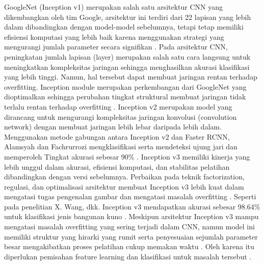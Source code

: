     GoogleNet (Inception v1) merupakan salah satu arsitektur CNN yang dikembangkan oleh tim Google, arsitektur ini terdiri dari 22 lapisan yang lebih dalam dibandingkan dengan model-model sebelumnya, tetapi tetap memiliki efisiensi komputasi yang lebih baik karena menggunakan strategi yang mengurangi jumlah parameter secara signifikan \autocite{Zhong2015}. Pada arsitektur CNN, peningkatan jumlah lapisan (layer) merupakan salah satu cara langsung untuk meningkatkan kompleksitas jaringan sehingga menghasilkan akurasi klasifikasi yang lebih tinggi. Namun, hal tersebut dapat membuat jaringan rentan terhadap overfitting. Inception module merupakan perkembangan dari GoogleNet yang dioptimalkan sehingga perubahan tingkat struktural membuat jaringan tidak terlalu rentan terhadap overfitting \autocite{Ahmed2020}. Inception v2 merupakan model yang dirancang untuk mengurangi kompleksitas jaringan konvolusi (convolution network) dengan membuat jaringan lebih lebar daripada lebih dalam. Menggunakan metode gabungan antara Inception v2 dan Faster RCNN, Alamsyah dan Fachrurrozi mengklasifikasi serta mendeteksi ujung jari dan memperoleh Tingkat akurasi sebesar 90\% \autocite{Alamsyah2019}. Inception v3 memiliki kinerja yang lebih unggul dalam akurasi, efisiensi komputasi, dan stabilitas pelatihan dibandingkan dengan versi sebelumnya. Perbaikan pada teknik factorization, regulasi, dan optimalisasi arsitektur membuat Inception v3 lebih kuat dalam mengatasi tugas pengenalan gambar dan mengatasi masalah overfitting \autocite{Lin2019}. Seperti pada penelitian X. Wang, dkk. Inception v3 mendapatkan akurasi sebesar 98.64\% untuk klasifikasi jenis bangunan kuno \autocite{Wang2022}. Meskipun arsitektur Inception v3 mampu mengatasi masalah overfitting yang sering terjadi dalam CNN, namun model ini memiliki struktur yang hirarki yang rumit serta penyesuaian sejumlah parameter besar mengakibatkan proses pelatihan cukup memakan waktu \autocite{Mujahid2022}. Oleh karena itu diperlukan pemisahan feature learning dan klasifikasi untuk masalah tersebut \autocite{Bae2020}.

